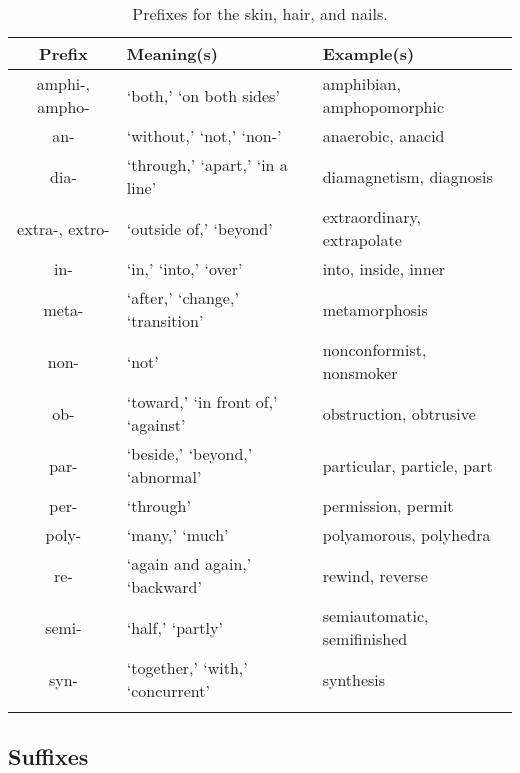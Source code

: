 \begin{longtable}{c | p{} | p{}}
    \caption{Prefixes for the skin, hair, and nails.}
    \hline
    Prefix & Meaning(s) & Example(s) \\ \hline
        amphi-, ampho- & `both,' `on both sides' & amphibian, amphopomorphic \\
        an- & `without,' `not,' `non-' & anaerobic, anacid \\
        dia- & `through,' `apart,' `in a line' & diamagnetism, diagnosis \\
        extra-, extro- & `outside of,' `beyond' & extraordinary, extrapolate \\
        in- & `in,' `into,' `over' & into, inside, inner \\
        meta- & `after,' `change,' `transition' & metamorphosis \\
        non- & `not' & nonconformist, nonsmoker \\
        ob- & `toward,' `in front of,' `against' & obstruction, obtrusive \\
        par- & `beside,' `beyond,' `abnormal' & particular, particle, part \\
        per- & `through' & permission, permit \\
        poly- & `many,' `much' & polyamorous, polyhedra \\
        re- & `again and again,' `backward' & rewind, reverse \\
        semi- & `half,' `partly' & semiautomatic, semifinished \\
        syn- & `together,' `with,' `concurrent' & synthesis \\
    \label{tab:Ch4Prefix}
\end{longtable}


\subsection{Suffixes}

